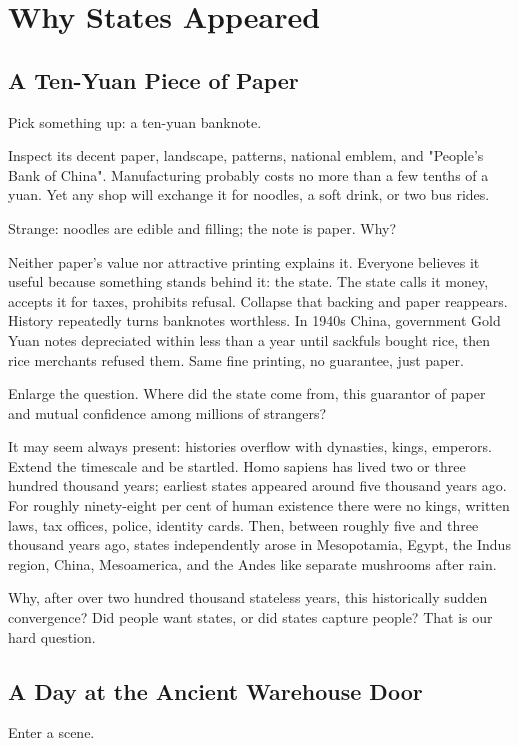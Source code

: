\chapter{Why States Appeared}
\section{A Ten-Yuan Piece of Paper}
Pick something up: a ten-yuan banknote.

Inspect its decent paper, landscape, patterns, national emblem, and "People's Bank of China". Manufacturing probably costs no more than a few tenths of a yuan. Yet any shop will exchange it for noodles, a soft drink, or two bus rides.

Strange: noodles are edible and filling; the note is paper. Why?

Neither paper's value nor attractive printing explains it. Everyone believes it useful because something stands behind it: the state. The state calls it money, accepts it for taxes, prohibits refusal. Collapse that backing and paper reappears. History repeatedly turns banknotes worthless. In 1940s China, government Gold Yuan notes depreciated within less than a year until sackfuls bought rice, then rice merchants refused them. Same fine printing, no guarantee, just paper.

Enlarge the question. Where did the state come from, this guarantor of paper and mutual confidence among millions of strangers?

It may seem always present: histories overflow with dynasties, kings, emperors. Extend the timescale and be startled. Homo sapiens has lived two or three hundred thousand years; earliest states appeared around five thousand years ago. For roughly ninety-eight per cent of human existence there were no kings, written laws, tax offices, police, identity cards. Then, between roughly five and three thousand years ago, states independently arose in Mesopotamia, Egypt, the Indus region, China, Mesoamerica, and the Andes like separate mushrooms after rain.

Why, after over two hundred thousand stateless years, this historically sudden convergence? Did people want states, or did states capture people? That is our hard question.

\section{A Day at the Ancient Warehouse Door}
Enter a scene.

